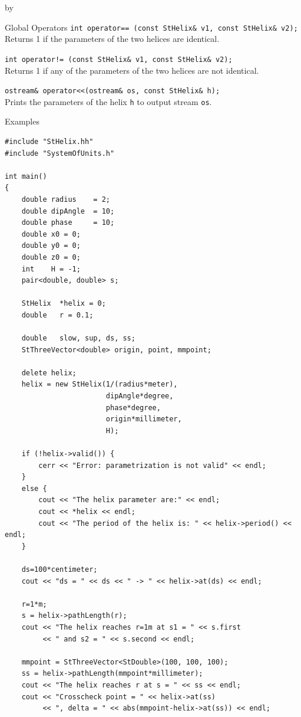 \documentclass[twoside]{article}
\newcommand{\comp}[1]{\texttt{#1}}%
\newcommand{\entrylabel}[1]{\mbox{\textbf{{#1}}}\hfil}%
\newenvironment{entry}
{\begin{list}{}%
    {\renewcommand{\makelabel}{\entrylabel}%
     \setlength{\labelwidth}{90pt}%
     \setlength{\leftmargin}{\labelwidth}
     \advance\leftmargin by \labelsep%
      }%
    }%
  {\end{list}}
\newcommand{\Entrylabel}[1]%
{\raisebox{0pt}[1ex][0pt]{\makebox[\labelwidth][l]%
    {\parbox[t]{\labelwidth}{\hspace{0pt}\textbf{{#1}}}}}}
\newenvironment{Entry}%
{\renewcommand{\entrylabel}{\Entrylabel}\begin{entry}}%
  {\end{entry}}
\begin{document}
\begin{description}
\begin{Entry}
\item[Global Operators]
    \verb+int operator== (const StHelix& v1, const StHelix& v2);+\\
    Returns 1 if the parameters of the two helices are identical.

    \verb+int operator!= (const StHelix& v1, const StHelix& v2);+\\
    Returns 1 if any of the parameters of the two helices are not
    identical.


    \verb+ostream& operator<<(ostream& os, const StHelix& h);+\\
    Prints the parameters of the helix \comp{h} to output
    stream \comp{os}.
    \newpage
    
\item[Examples]
{\footnotesize
\begin{verbatim}
#include "StHelix.hh"
#include "SystemOfUnits.h"

int main()
{
    double radius    = 2;
    double dipAngle  = 10;
    double phase     = 10;
    double x0 = 0;
    double y0 = 0;
    double z0 = 0;
    int    H = -1;
    pair<double, double> s;
    
    StHelix  *helix = 0;
    double   r = 0.1;
 
    double   slow, sup, ds, ss;
    StThreeVector<double> origin, point, mmpoint;

    delete helix;
    helix = new StHelix(1/(radius*meter),
                        dipAngle*degree,
                        phase*degree,
                        origin*millimeter,
                        H);

    if (!helix->valid()) {
        cerr << "Error: parametrization is not valid" << endl;
    }
    else {
        cout << "The helix parameter are:" << endl;
        cout << *helix << endl;
        cout << "The period of the helix is: " << helix->period() << endl;
    }

    ds=100*centimeter;
    cout << "ds = " << ds << " -> " << helix->at(ds) << endl;

    r=1*m;
    s = helix->pathLength(r);
    cout << "The helix reaches r=1m at s1 = " << s.first
         << " and s2 = " << s.second << endl;

    mmpoint = StThreeVector<StDouble>(100, 100, 100);
    ss = helix->pathLength(mmpoint*millimeter);
    cout << "The helix reaches r at s = " << ss << endl;
    cout << "Crosscheck point = " << helix->at(ss)
         << ", delta = " << abs(mmpoint-helix->at(ss)) << endl;


\end{verbatim}}
\end{Entry}
\end{description}
\end{document}
